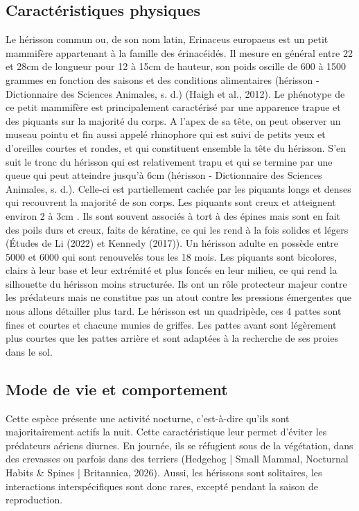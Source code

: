 \documentclass[a4paper,11pt]{article}
\begin{document}
\subsection{Caractéristiques physiques}
Le hérisson commun ou, de son nom latin, Erinaceus europaeus est un petit mammifère appartenant à la famille des érinacéidés. Il mesure en général entre 22 et 28cm de longueur pour 12 à 15cm de hauteur, son poids oscille de 600 à 1500 grammes en fonction des saisons et des conditions alimentaires (hérisson - Dictionnaire des Sciences Animales, s. d.) (Haigh et al., 2012). Le phénotype de ce petit mammifère est principalement caractérisé par une apparence trapue et des piquants sur la majorité du corps. A l’apex de sa tête, on peut observer un museau pointu et fin aussi appelé rhinophore qui est suivi de petits yeux et d’oreilles courtes et rondes, et qui constituent ensemble la tête du hérisson. S’en suit le tronc du hérisson qui est relativement trapu et qui se termine par une queue qui peut atteindre jusqu’à 6cm (hérisson - Dictionnaire des Sciences Animales, s. d.). Celle-ci est partiellement cachée par les piquants longs et denses qui recouvrent la majorité de son corps. Les piquants sont creux et atteignent environ 2 à 3cm . Ils sont souvent associés à tort à des épines mais sont en fait des poils durs et creux, faits de kératine, ce qui les rend à la fois solides et légers (Études de Li (2022) et Kennedy (2017)). Un hérisson adulte en possède entre 5000 et 6000 qui sont renouvelés tous les 18 mois. Les piquants sont bicolores, clairs à leur base et leur extrémité et plus foncés en leur milieu, ce qui rend la silhouette du hérisson moins structurée. Ils ont un rôle protecteur majeur contre les prédateurs mais ne constitue pas un atout contre les pressions émergentes que nous allons détailler plus tard. Le hérisson est un quadripède, ces 4 pattes sont fines et courtes et chacune munies de griffes. Les pattes avant sont légèrement plus courtes que les pattes arrière et sont adaptées à la recherche de ses proies dans le sol. 

\subsection{Mode de vie et comportement}
Cette espèce présente une activité nocturne, c’est-à-dire qu’ils sont majoritairement actifs la nuit. Cette caractéristique leur permet d’éviter les prédateurs aériens diurnes. En journée, ils se réfugient sous de la végétation, dans des crevasses ou parfois dans des terriers (Hedgehog | Small Mammal, Nocturnal Habits \& Spines | Britannica, 2026). Aussi, les hérissons sont solitaires, les interactions interspécifiques sont donc rares, excepté pendant la saison de reproduction.
\end{document}

